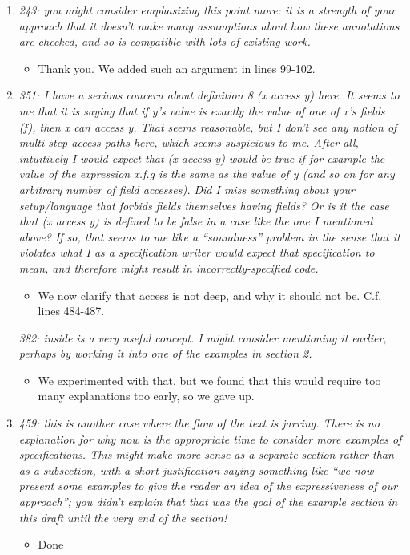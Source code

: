 \documentclass[11pt]{amsart}
\begin{document}
\begin{enumerate}
\item
\emph{
243: you might consider emphasizing this point more: it is a strength of your approach that it doesn’t make many assumptions about how these annotations are checked, and so is compatible with lots of existing work.}
\begin{itemize}
\item  
Thank you. We added such an argument in lines 99-102.
\end{itemize}

\item
\emph{
351: I have a serious concern about definition 8 (x access y) here. It seems to me that it is saying that if y’s value is exactly the value of one of x’s fields (f), then x can access y. That seems reasonable, but I don’t see any notion of multi-step access paths here, which seems suspicious to me. After all, intuitively I would expect that (x access y) would be true if for example the value of the expression x.f.g is the same as the value of y (and so on for any arbitrary number of field accesses). Did I miss something about your setup/language that forbids fields themselves having fields? Or is it the case that (x access y) is defined to be false in a case like the one I mentioned above? If so, that seems to me like a “soundness” problem in the sense that it violates what I as a specification writer would expect that specification to mean, and therefore might result in incorrectly-specified code.}
\begin{itemize}
\item  
We now clarify that access is not deep, and why it should not be. C.f. lines 484-487.
\end{itemize}

\emph{
382: inside is a very useful concept. I might consider mentioning it earlier, perhaps by working it into one of the examples in section 2.}
\begin{itemize}
\item  
We experimented with that, but we found that this would require too many explanations too early, so we gave up. 
\end{itemize}

\item
\emph{
459: this is another case where the flow of the text is jarring. There is no explanation for why now is the appropriate time to consider more examples of specifications. This might make more sense as a separate section rather than as a subsection, with a short justification saying something like “we now present some examples to give the reader an idea of the expressiveness of our approach”; you didn’t explain that that was the goal of the example section in this draft until the very end of the section!}
\begin{itemize}
\item  
Done
\end{itemize}


\end{enumerate}
\end{document}
